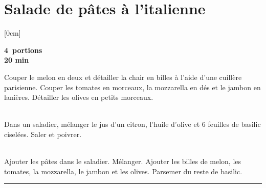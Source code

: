 \section{Salade de pâtes à l'italienne}		%

[0cm]

\begin{flushright}
	\textbf{4 portions} \\
	\textbf{20 min}
\end{flushright}

\vspace{.5cm}

\noindent
Couper le melon en deux et détailler la chair en billes à l'aide d'une cuillère parisienne. Couper les tomates en morceaux, la mozzarella en dés et le jambon en lanières. Détailler les olives en petits morceaux. \par
~\\
\noindent
Dans un saladier, mélanger le jus d'un citron, l'huile d'olive et 6 feuilles de basilic ciselées. Saler et poivrer.
\par ~\\
\noindent
Ajouter les pâtes dans le saladier. Mélanger. Ajouter les billes de melon, les tomates, la mozzarella, le jambon et les olives. Parsemer du reste de basilic.

\begin{center}
	\par\noindent\rule{.5\textwidth}{0.4pt} 
\end{center}


\restoregeometry
